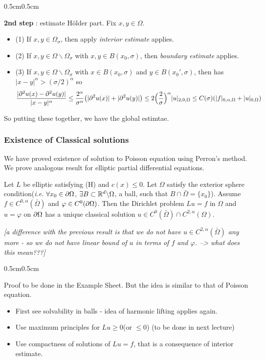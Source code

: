 \documentclass[12pt,a4paper]{article}
\newenvironment{proof}
{\begin{changemargin}{0.5cm}{0.5cm} 
	}%
	{\end{changemargin}
}
\renewenvironment{i}
{\begin{itemize} 
	}%
	{\end{itemize}
}
\newenvironment{p}
{\begin{proof} 
	}%
	{\end{proof}
}
\begin{document}
\begin{p}
\textbf{2nd step} : estimate H\"older part. Fix $x,y\in \Omega$.
\begin{i}
\item[(1)] If $x, y\in \Omega_{\sigma}$, then apply \emph{interior estimate} applies.
\item[(2)] If $x, y\in \Omega \backslash \Omega_{\sigma}$ with $x, y\in B(x_0, \sigma)$, then \emph{boundary estimate} applies.
\item[(3)] If $x, y\in \Omega \backslash \Omega_{\sigma}$ with $x\in B(x_0, \sigma)$ and $y \in B(x_0', \sigma)$, then has $|x-y|^{\alpha} > (\sigma /2)^{\alpha}$ so
\begin{align*}
\frac{|\partial^2 u(x) - \partial^2 u(y)|}{|x-y|^{\alpha}} \leq \frac{2^{\alpha}}{\sigma^{\alpha}} \big(|\partial^2 u(x)| + |\partial^2 u(y)| \big) \leq 2\Big(\frac{2}{\sigma} \Big)^{\alpha} |u|_{2, 0, \Omega} \leq C(\sigma)(|f|_{0, \alpha, \Omega} + |u|_{0, \Omega})
\end{align*}
\end{i}
So putting these together, we have the global estimtae.

\eop
\end{p}
\s

\subsubsection*{Existence of Classical solutions}

We have proved existence of solution to Poisson equation using Perron's method. We prove analogous result for elliptic partial differential equations.
\s

\thm Let $L$ be elliptic satisfying (H) and $c(x) \leq 0$. Let $\Omega$ satisfy the exterior sphere condition(\textit{i.e.} $\forall x_0 \in \partial \Omega$, $\exists B \subset \mathbb{R}^d \backslash \Omega$, a ball, such that $B\cap \bar{\Omega} = \{x_0 \}$). Assume $f\in C^{0, \alpha}(\bar{\Omega})$ and $\varphi \in C^0(\partial \Omega)$. Then the Dirichlet problem $Lu =f$ in $\Omega$ and $u= \varphi$ on $\partial \Omega$ has a unique classical solution $u\in C^0(\bar{\Omega}) \cap C^{2, \alpha}(\Omega)$.

\emph{[a difference with the previous result is that we do not have $u \in C^{2, \alpha}(\bar{\Omega})$ any more - so we do not have linear bound of $u$ in terms of $f$ and $\varphi$. --> what does this mean???]}
\begin{p}
\pf Proof to be done in the Example Sheet. But the idea is similar to that of Poisson equation.
\begin{i}
\item First see solvability in balls - idea of harmonic lifting applies again. 
\item Use maximum principles for $Lu \geq 0$(or $\leq 0$) (to be done in next lecture)
\item Use compactness of solutions of $Lu =f$, that is a consequence of interior estimate.
\end{i} 
\end{p}
\s
\end{document}
